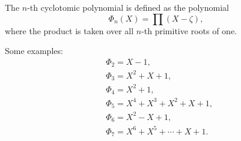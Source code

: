 







\begin{definition}
	The $n$-th cyclotomic polynomial 
	is defined as the polynomial
	\begin{equation}
		\label{eq:ciclotomico}
		\Phi_n(X)=\prod(X-\zeta),
	\end{equation}
	where the product is taken over all 
	$n$-th primitive roots of one. 
\end{definition}

Some examples:
	\begin{align*}
		&\Phi_2=X-1,\\
		&\Phi_3=X^2+X+1,\\
		&\Phi_4=X^2+1,\\
		&\Phi_5=X^4+X^3+X^2+X+1,\\
		&\Phi_6=X^2-X+1,\\
		&\Phi_7=X^6+X^5+\cdots+X+1.
	\end{align*}

